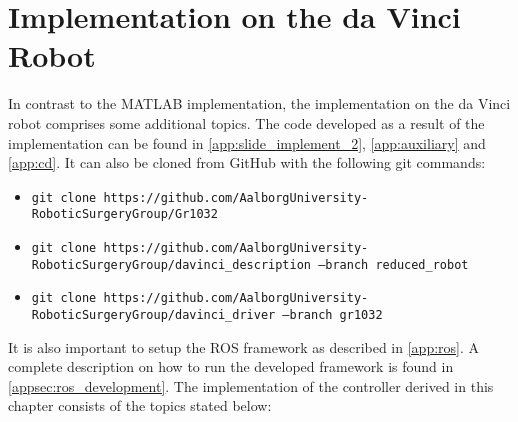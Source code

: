 \section{Implementation on the da Vinci Robot}
In contrast to the MATLAB implementation, the implementation on the da Vinci robot comprises  some additional topics. The code developed as a result of the implementation can be found in \autoref{app:slide_implement_2}, \autoref{app:auxiliary} and \autoref{app:cd}. It can also be cloned from GitHub with the following git commands:
\begin{itemize}
\item \texttt{git clone https://github.com/AalborgUniversity-RoboticSurgeryGroup/Gr1032}
\item \texttt{git clone https://github.com/AalborgUniversity-RoboticSurgeryGroup/\newline davinci\_description ---branch reduced\_robot} 
\item \texttt{git clone https://github.com/AalborgUniversity-RoboticSurgeryGroup/\newline davinci\_driver ---branch gr1032}
\end{itemize}
It is also important to setup the ROS framework as described in \autoref{app:ros}. A complete description on how to run the developed framework is found in \autoref{appsec:ros_development}. The implementation of the controller derived in this chapter consists of the topics stated below:
